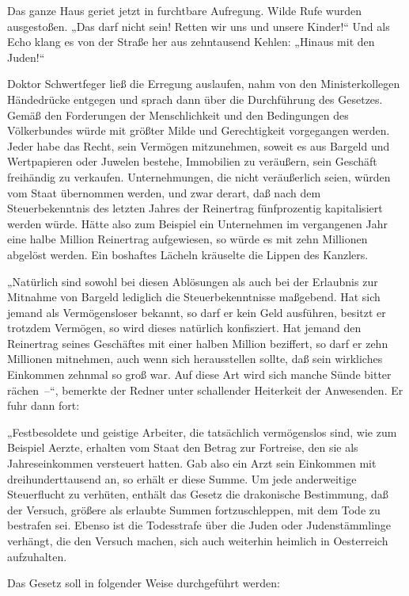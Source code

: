 Das ganze Haus geriet jetzt in furchtbare Aufregung. Wilde Rufe
wurden ausgestoßen. „Das darf nicht sein! Retten wir uns und unsere
Kinder!“ Und als Echo klang es von der Straße her aus zehntausend
Kehlen: „Hinaus mit den Juden!“

Doktor Schwertfeger ließ die Erregung auslaufen, nahm von den
Ministerkollegen Händedrücke entgegen und sprach dann über die
Durchführung des Gesetzes.  Gemäß den Forderungen
der Menschlichkeit und den Bedingungen des Völkerbundes würde mit
größter Milde und Gerechtigkeit vorgegangen werden. Jeder habe das
Recht, sein Vermögen mitzunehmen, soweit es aus Bargeld und
Wertpapieren oder Juwelen bestehe, Immobilien zu veräußern, sein
Geschäft freihändig zu verkaufen. Unternehmungen, die nicht
veräußerlich seien, würden vom Staat übernommen werden, und zwar
derart, daß nach dem Steuerbekenntnis des letzten Jahres der
Reinertrag fünfprozentig kapitalisiert werden würde. Hätte also zum
Beispiel ein Unternehmen im vergangenen Jahr eine halbe Million
Reinertrag aufgewiesen, so würde es mit zehn Millionen abgelöst
werden. Ein boshaftes Lächeln kräuselte die Lippen des Kanzlers.

„Natürlich sind sowohl bei diesen Ablösungen als auch bei der
Erlaubnis zur Mitnahme von Bargeld lediglich die Steuerbekenntnisse
maßgebend. Hat sich jemand als Vermögensloser bekannt, so darf er
kein Geld ausführen, besitzt er trotzdem Vermögen, so wird dieses
natürlich konfisziert. Hat jemand den Reinertrag seines Geschäftes
mit einer halben Million beziffert, so darf er zehn Millionen
mitnehmen, auch wenn sich herausstellen sollte, daß sein wirkliches
Einkommen zehnmal so groß war. Auf diese Art wird sich manche Sünde
bitter rächen~–“, bemerkte der Redner unter schallender Heiterkeit
der Anwesenden. Er fuhr dann fort:

„Festbesoldete und geistige Arbeiter, die tatsächlich vermögenslos
sind, wie zum Beispiel Aerzte, erhalten vom Staat den Betrag zur
Fortreise, den sie als Jahreseinkommen  versteuert
hatten. Gab also ein Arzt sein Einkommen mit dreihunderttausend an,
so erhält er diese Summe. Um jede anderweitige Steuerflucht zu
verhüten, enthält das Gesetz die drakonische Bestimmung, daß der
Versuch, größere als erlaubte Summen fortzuschleppen, mit dem Tode
zu bestrafen sei. Ebenso ist die Todesstrafe über die Juden oder
Judenstämmlinge verhängt, die den Versuch machen, sich auch
weiterhin heimlich in Oesterreich aufzuhalten.

Das Gesetz soll in folgender Weise durchgeführt werden:

